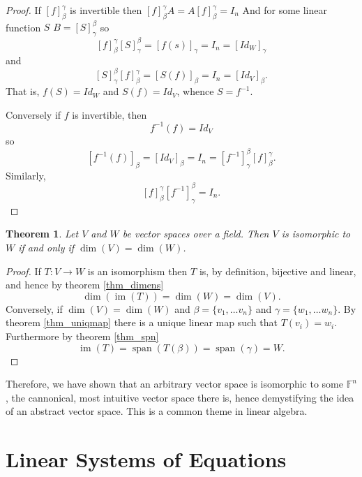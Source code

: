 \documentclass[oneside, 12pt]{book}
\DeclareMathOperator{\spn}{span}
\DeclareMathOperator{\im}{im}
\newtheorem{thm}{Theorem}[section]
\theoremstyle{definition}
\begin{document}
\begin{proof}
  If $[f]_{\beta}^{\gamma}$ is invertible then $[f]_{\beta}^{\gamma}A=A[f]_{\beta}^{\gamma}=I_{n}$ And for some linear function $S$ $B=[S]_{\gamma}^{\beta}$ so
  \[[f]_{\beta}^{\gamma}[S]_{\gamma}^{\beta}=[f(s)]_{\gamma}=I_{n}=[Id_{W}]_{\gamma}\] and \[[S]_{\gamma}^{\beta}[f]_{\beta}^{\gamma}=[S(f)]_{\beta}=I_{n}=[Id_{V}]_{\beta}.\]
  That is, $f(S)=Id_{W}$ and $S(f)=Id_{V}$, whence $S=f^{-1}$.

  Conversely if $f$ is invertible, then \[f^{-1}(f)=Id_{V}\] so \[[f^{-1}(f)]_{\beta}=[Id_{V}]_{\beta}=I_{n}=[f^{-1}]_{\gamma}^{\beta}[f]_{\beta}^{\gamma}.\]Similarly, \[[f]_{\beta}^{\gamma}[f^{-1}]_{\gamma}^{\beta}=I_{n}.\]
\end{proof}
\begin{thm}
  \label{thm_iso}
  Let $V$ and $W$ be vector spaces over a field. Then $V$ is isomorphic to $W$ if and only if $\dim(V)=\dim(W)$.
\end{thm}
\begin{proof}
  If $T:V \to W$ is an isomorphism then $T$ is, by definition, bijective and linear, and hence by theorem \ref{thm_dimens}
  \[\dim(\im(T))=\dim(W)=\dim(V).\] Conversely, if $\dim(V)=\dim(W)$ and $\beta=\{v_{1}, \dots v_{n}\}$ and $\gamma =\{w_{1}, \dots w_{n}\}$. By theorem \ref{thm_uniqmap} there is a unique linear map such that $T(v_{i})=w_{i}$. Furthermore by theorem \ref{thm_spn} \[\im(T)=\spn(T(\beta))=\spn(\gamma)=W.\]
\end{proof}
Therefore, we have shown that an arbitrary vector space is isomorphic to some $\mathbb{F}^{n}$, the cannonical, most intuitive vector space there is, hence demystifying the idea of an abstract vector space. This is a common theme in linear algebra.
\chapter{Linear Systems of Equations}
\end{document}
